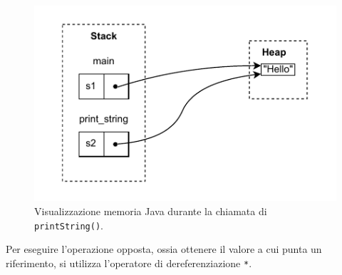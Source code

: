 \begin{figure}[H]
    \label{fig:bor2}
    \centering
    \includegraphics[scale = 1]{Figures/bor2.drawio.pdf}
    \caption{Visualizzazione memoria Java durante la chiamata di \texttt{printString()}.}
\end{figure} 
Per eseguire l'operazione opposta, ossia ottenere il valore a cui punta un riferimento, si utilizza l'operatore di dereferenziazione \texttt{*}. 

